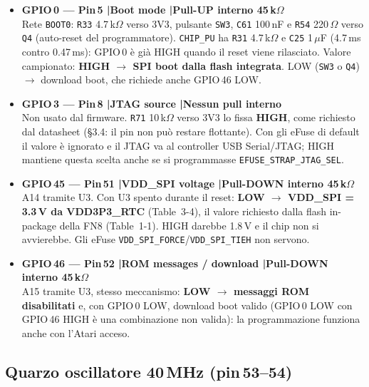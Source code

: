 \documentclass[12pt, a4paper]{article}
\begin{document}
\begin{itemize}

  \item \textbf{GPIO\,0 — Pin\,5 \quad|\quad Boot mode \quad|\quad Pull-UP interno
        45\,k$\Omega$}\\
    Rete \texttt{BOOT0}: \texttt{R33} 4.7\,k$\Omega$ verso 3V3, pulsante \texttt{SW3}, \texttt{C61}
    100\,nF e \texttt{R54} 220\,$\Omega$ verso \texttt{Q4} (auto-reset del programmatore).
    \texttt{CHIP\_PU} ha \texttt{R31} 4.7\,k$\Omega$ e \texttt{C25} 1\,$\mu$F (4.7\,ms contro
    0.47\,ms): GPIO\,0 è già HIGH quando il reset viene rilasciato.
    Valore campionato: \textbf{HIGH $\rightarrow$ SPI boot dalla flash integrata}.
    LOW (\texttt{SW3} o \texttt{Q4}) $\rightarrow$ download boot, che richiede anche GPIO\,46 LOW.

  \item \textbf{GPIO\,3 — Pin\,8 \quad|\quad JTAG source \quad|\quad Nessun pull interno}\\
    Non usato dal firmware. \texttt{R71} 10\,k$\Omega$ verso 3V3 lo fissa \textbf{HIGH},
    come richiesto dal datasheet (§3.4: il pin non può restare flottante). Con gli eFuse
    di default il valore è ignorato e il JTAG va al controller USB Serial/JTAG; HIGH
    mantiene questa scelta anche se si programmasse \texttt{EFUSE\_STRAP\_JTAG\_SEL}.

  \item \textbf{GPIO\,45 — Pin\,51 \quad|\quad VDD\_SPI voltage \quad|\quad Pull-DOWN
        interno 45\,k$\Omega$}\\
    A14 tramite U3. Con U3 spento durante il reset: \textbf{LOW $\rightarrow$ VDD\_SPI =
    3.3\,V da VDD3P3\_RTC} (Table~3-4), il valore richiesto dalla flash in-package della FN8
    (Table~1-1). HIGH darebbe 1.8\,V e il chip non si avvierebbe. Gli eFuse
    \texttt{VDD\_SPI\_FORCE}/\texttt{VDD\_SPI\_TIEH} non servono.

  \item \textbf{GPIO\,46 — Pin\,52 \quad|\quad ROM messages / download \quad|\quad Pull-DOWN
        interno 45\,k$\Omega$}\\
    A15 tramite U3, stesso meccanismo: \textbf{LOW $\rightarrow$ messaggi ROM disabilitati}
    e, con GPIO\,0 LOW, download boot valido (GPIO\,0 LOW con GPIO\,46 HIGH è una
    combinazione non valida): la programmazione funziona anche con l'Atari acceso.

\end{itemize}

\subsection{Quarzo oscillatore 40\,MHz (pin\,53--54)}
\label{sec:xtal}
\end{document}
